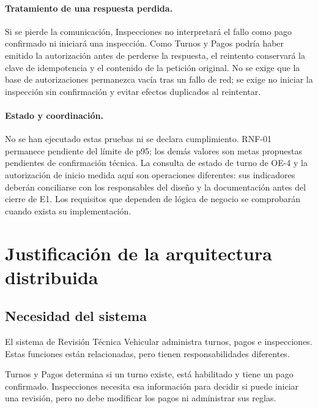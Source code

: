 \documentclass[11pt,a4paper]{article}
\begin{document}
\paragraph{Tratamiento de una respuesta perdida.}
Si se pierde la comunicación, Inspecciones no interpretará el fallo como pago confirmado ni iniciará una inspección. Como Turnos y Pagos podría haber emitido la autorización antes de perderse la respuesta, el reintento conservará la clave de idempotencia y el contenido de la petición original. No se exige que la base de autorizaciones permanezca vacía tras un fallo de red; se exige no iniciar la inspección sin confirmación y evitar efectos duplicados al reintentar.

\paragraph{Estado y coordinación.}
No se han ejecutado estas pruebas ni se declara cumplimiento. RNF-01 permanece pendiente del límite de p95; los demás valores son metas propuestas pendientes de confirmación técnica. La consulta de estado de turno de OE-4 y la autorización de inicio medida aquí son operaciones diferentes: sus indicadores deberán conciliarse con los responsables del diseño y la documentación antes del cierre de E1. Los requisitos que dependen de lógica de negocio se comprobarán cuando exista su implementación.

\section{Justificación de la arquitectura distribuida}
\label{sec:justificacion}
\subsection{Necesidad del sistema}

El sistema de Revisión Técnica Vehicular administra turnos, pagos e inspecciones. Estas funciones están relacionadas, pero tienen responsabilidades diferentes.

Turnos y Pagos determina si un turno existe, está habilitado y tiene un pago confirmado. Inspecciones necesita esa información para decidir si puede iniciar una revisión, pero no debe modificar los pagos ni administrar sus reglas.
\end{document}
